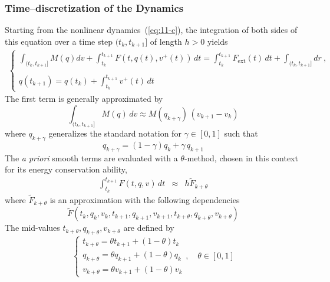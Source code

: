 \subsubsection{Time--discretization of the Dynamics}
Starting from the nonlinear dynamics~(\ref{eq:11-c}), the integration of  both sides of this equation over a time step $(t_k,t_{k+1}]$ of length $h>0$ yields\begin{eqnarray}
  \begin{cases}
    \displaystyle \int_{(t_k,t_{k+1}]} M(q) dv + \int_{t_k}^{t_{k+1}} F(t, q(t), v^+(t)) \,dt = \displaystyle \int_{t_k}^{t_{k+1}} F_{\mathrm{ext}}(t)\,dt +
        \displaystyle \int_{(t_k,t_{k+1}]} dr \:, \\ \\
     q(t_{k+1}) = q(t_{k}) + \displaystyle \int_{t_k}^{t_{k+1}} v^+(t)\,dt
   \end{cases}
\end{eqnarray}
The first term is generally approximated by
\begin{equation}
\label{eq:19-NL}
  \displaystyle \int_{(t_k,t_{k+1}]} M(q) \,dv \approx  M(q_{k+\gamma})\,(v_{k+1}-v_{k})
\end{equation}
where $q_{k+\gamma}$ generalizes the standard notation for $\gamma \in [0,1]$ such that
\begin{equation}
  \label{eq:NL1}
  q_{k+\gamma} = (1-\gamma) q_{k} + \gamma\,  q_{k+1}
\end{equation}
The \textit{a priori} smooth terms are evaluated with a $\theta$-method, chosen in this context for its energy conservation ability,
\begin{eqnarray}
  \displaystyle \int_{t_k}^{t_{k+1}} F(t,q,v) \,dt  &\approx&
  h  \tilde F_{k+\theta}
\end{eqnarray}
where $\tilde F_{k+\theta}$ is an approximation with the following dependencies
$$ \tilde F(t_k,q_k,v_k,t_{k+1},q_{k+1},v_{k+1},t_{k+\theta},q_{k+\theta},v_{k+\theta}) $$
The mid-values $t_{k+\theta},q_{k+\theta},v_{k+\theta}$ are defined by
\begin{equation}
  \label{eq:NSCD-discret-b}
  \left\{\begin{array}{l}
  t_{k+\theta} = \theta t_{k+1}+(1-\theta) t_{k}\\
  q_{k+\theta} = \theta q_{k+1}+(1-\theta) q_{k}\\
  v_{k+\theta} = \theta v_{k+1}+(1-\theta) v_{k}
  \end{array}\right.,\quad  \theta \in [0,1]
\end{equation}


